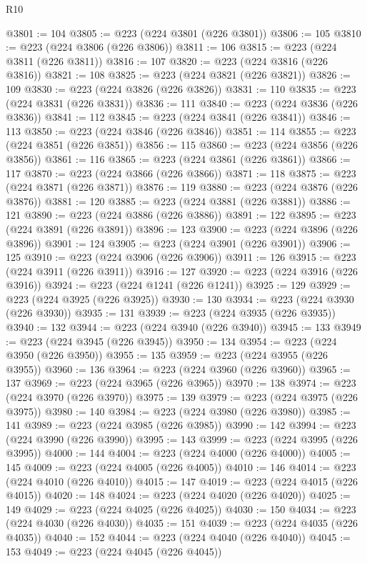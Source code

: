 \begin{lexlean}{R10}
\begin{coremodule}
@3801 := 104
@3805 := @223 (@224 @3801 (@226 @3801))
@3806 := 105
@3810 := @223 (@224 @3806 (@226 @3806))
@3811 := 106
@3815 := @223 (@224 @3811 (@226 @3811))
@3816 := 107
@3820 := @223 (@224 @3816 (@226 @3816))
@3821 := 108
@3825 := @223 (@224 @3821 (@226 @3821))
@3826 := 109
@3830 := @223 (@224 @3826 (@226 @3826))
@3831 := 110
@3835 := @223 (@224 @3831 (@226 @3831))
@3836 := 111
@3840 := @223 (@224 @3836 (@226 @3836))
@3841 := 112
@3845 := @223 (@224 @3841 (@226 @3841))
@3846 := 113
@3850 := @223 (@224 @3846 (@226 @3846))
@3851 := 114
@3855 := @223 (@224 @3851 (@226 @3851))
@3856 := 115
@3860 := @223 (@224 @3856 (@226 @3856))
@3861 := 116
@3865 := @223 (@224 @3861 (@226 @3861))
@3866 := 117
@3870 := @223 (@224 @3866 (@226 @3866))
@3871 := 118
@3875 := @223 (@224 @3871 (@226 @3871))
@3876 := 119
@3880 := @223 (@224 @3876 (@226 @3876))
@3881 := 120
@3885 := @223 (@224 @3881 (@226 @3881))
@3886 := 121
@3890 := @223 (@224 @3886 (@226 @3886))
@3891 := 122
@3895 := @223 (@224 @3891 (@226 @3891))
@3896 := 123
@3900 := @223 (@224 @3896 (@226 @3896))
@3901 := 124
@3905 := @223 (@224 @3901 (@226 @3901))
@3906 := 125
@3910 := @223 (@224 @3906 (@226 @3906))
@3911 := 126
@3915 := @223 (@224 @3911 (@226 @3911))
@3916 := 127
@3920 := @223 (@224 @3916 (@226 @3916))
@3924 := @223 (@224 @1241 (@226 @1241))
@3925 := 129
@3929 := @223 (@224 @3925 (@226 @3925))
@3930 := 130
@3934 := @223 (@224 @3930 (@226 @3930))
@3935 := 131
@3939 := @223 (@224 @3935 (@226 @3935))
@3940 := 132
@3944 := @223 (@224 @3940 (@226 @3940))
@3945 := 133
@3949 := @223 (@224 @3945 (@226 @3945))
@3950 := 134
@3954 := @223 (@224 @3950 (@226 @3950))
@3955 := 135
@3959 := @223 (@224 @3955 (@226 @3955))
@3960 := 136
@3964 := @223 (@224 @3960 (@226 @3960))
@3965 := 137
@3969 := @223 (@224 @3965 (@226 @3965))
@3970 := 138
@3974 := @223 (@224 @3970 (@226 @3970))
@3975 := 139
@3979 := @223 (@224 @3975 (@226 @3975))
@3980 := 140
@3984 := @223 (@224 @3980 (@226 @3980))
@3985 := 141
@3989 := @223 (@224 @3985 (@226 @3985))
@3990 := 142
@3994 := @223 (@224 @3990 (@226 @3990))
@3995 := 143
@3999 := @223 (@224 @3995 (@226 @3995))
@4000 := 144
@4004 := @223 (@224 @4000 (@226 @4000))
@4005 := 145
@4009 := @223 (@224 @4005 (@226 @4005))
@4010 := 146
@4014 := @223 (@224 @4010 (@226 @4010))
@4015 := 147
@4019 := @223 (@224 @4015 (@226 @4015))
@4020 := 148
@4024 := @223 (@224 @4020 (@226 @4020))
@4025 := 149
@4029 := @223 (@224 @4025 (@226 @4025))
@4030 := 150
@4034 := @223 (@224 @4030 (@226 @4030))
@4035 := 151
@4039 := @223 (@224 @4035 (@226 @4035))
@4040 := 152
@4044 := @223 (@224 @4040 (@226 @4040))
@4045 := 153
@4049 := @223 (@224 @4045 (@226 @4045))

\end{coremodule}
\end{lexlean}
